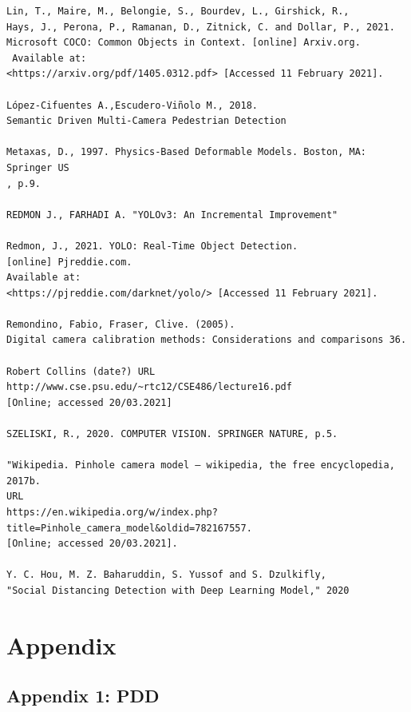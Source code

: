 \documentclass[12pt]{report}
\begin{document}
\begin{verbatim}
Lin, T., Maire, M., Belongie, S., Bourdev, L., Girshick, R., 
Hays, J., Perona, P., Ramanan, D., Zitnick, C. and Dollar, P., 2021.
Microsoft COCO: Common Objects in Context. [online] Arxiv.org.
 Available at:
<https://arxiv.org/pdf/1405.0312.pdf> [Accessed 11 February 2021].

López-Cifuentes A.,Escudero-Viñolo M., 2018. 
Semantic Driven Multi-Camera Pedestrian Detection

Metaxas, D., 1997. Physics-Based Deformable Models. Boston, MA: Springer US
, p.9.

REDMON J., FARHADI A. "YOLOv3: An Incremental Improvement"

Redmon, J., 2021. YOLO: Real-Time Object Detection. 
[online] Pjreddie.com. 
Available at:
<https://pjreddie.com/darknet/yolo/> [Accessed 11 February 2021].

Remondino, Fabio, Fraser, Clive. (2005). 
Digital camera calibration methods: Considerations and comparisons 36. 

Robert Collins (date?) URL 
http://www.cse.psu.edu/~rtc12/CSE486/lecture16.pdf 
[Online; accessed 20/03.2021]

SZELISKI, R., 2020. COMPUTER VISION. SPRINGER NATURE, p.5.

"Wikipedia. Pinhole camera model — wikipedia, the free encyclopedia, 2017b. 
URL
https://en.wikipedia.org/w/index.php?title=Pinhole_camera_model&oldid=782167557. 
[Online; accessed 20/03.2021].

Y. C. Hou, M. Z. Baharuddin, S. Yussof and S. Dzulkifly, 
"Social Distancing Detection with Deep Learning Model," 2020

\end{verbatim}

\chapter*{Appendix}

\section*{Appendix 1: PDD}
\end{document}
